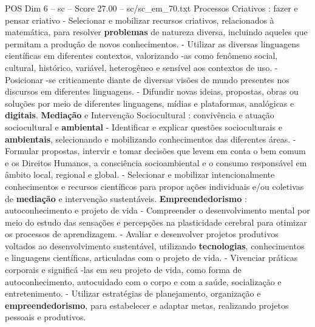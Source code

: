 \begin{textsample}{POS Dim 6 – sc – Score 27.00 – sc/sc\_em\_70.txt}
Processos Criativos : fazer e pensar criativo - Selecionar e mobilizar recursos criativos, relacionados à matemática, para resolver \textbf{problemas} de natureza diversa, incluindo aqueles que permitam a produção de novos conhecimentos. - Utilizar as diversas linguagens científicas em diferentes contextos, valorizando -as como fenômeno social, cultural, histórico, variável, heterogêneo e sensível aos contextos de uso. - Posicionar -se criticamente diante de diversas visões de mundo presentes nos discursos em diferentes linguagens. - Difundir novas ideias, propostas, obras ou soluções por meio de diferentes linguagens, mídias e plataformas, analógicas e \textbf{digitais}. \textbf{Mediação} e Intervenção Sociocultural : convivência e atuação sociocultural e \textbf{ambiental} - Identificar e explicar questões socioculturais e \textbf{ambientais}, selecionando e mobilizando conhecimentos das diferentes áreas. - Formular propostas, intervir e tomar decisões que levem em conta o bem comum e os Direitos Humanos, a consciência socioambiental e o consumo responsável em âmbito local, regional e global. - Selecionar e mobilizar intencionalmente conhecimentos e recursos científicos para propor ações individuais e/ou coletivas de \textbf{mediação} e intervenção sustentáveis. \textbf{Empreendedorismo} : autoconhecimento e projeto de vida - Compreender o desenvolvimento mental por meio do estudo das sensações e percepções na plasticidade cerebral para otimizar os processos de aprendizagem. - Avaliar e desenvolver projetos produtivos voltados ao desenvolvimento sustentável, utilizando \textbf{tecnologias}, conhecimentos e linguagens científicas, articuladas com o projeto de vida. - Vivenciar práticas corporais e significá -las em seu projeto de vida, como forma de autoconhecimento, autocuidado com o corpo e com a saúde, socialização e entretenimento. - Utilizar estratégias de planejamento, organização e \textbf{empreendedorismo}, para estabelecer e adaptar metas, realizando projetos pessoais e produtivos.

\end{textsample}
